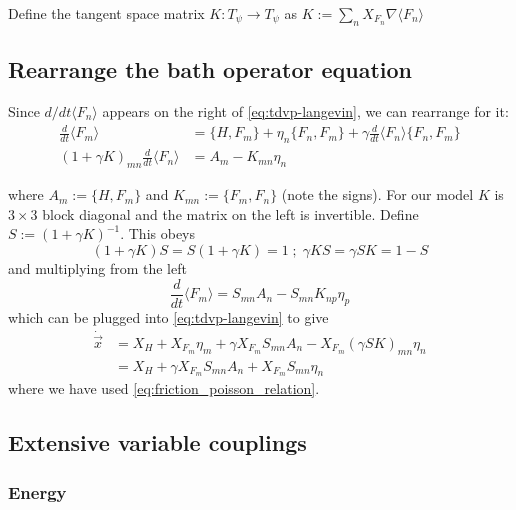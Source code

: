        Define the tangent space matrix $K: T_\psi\to T_\psi$ as $K:=\sum_n X_{F_n} \nabla\langle F_n\rangle$

    \subsection{Rearrange the bath operator equation}
        Since $d/dt\langle F_n\rangle$ appears on the right of \ref{eq:tdvp-langevin}, we can rearrange for it:
        \begin{align*}
        \frac{d}{dt}\langle F_m\rangle  &= \{H, F_m\} + \eta_n\{ F_n, F_m\}+ \gamma \frac{d}{dt}\langle F_n \rangle \{F_n, F_m\}\\
        (1+ \gamma K)_{mn} \frac{d}{dt}\langle F_n\rangle &= A_m - K_{mn}\eta_n    
        \end{align*}
        
        where $A_m:=\{H, F_m\}$ and $K_{mn}:=\{F_m,F_n\} $ (note the signs). For our model $K$ is $3\times 3$ block diagonal and the matrix on the left is invertible. Define $S:=(1+\gamma K)^{-1}$. This obeys  
        \begin{equation}\label{eq:friction_poisson_relation}
            (1+\gamma K)S = S(1+\gamma K) = 1 \; ;\; \gamma K S = \gamma SK = 1 - S
        \end{equation}
        and multiplying from the left
        \begin{equation}\label{eq:bath_time_dep}
            \frac{d}{dt}\langle F_m\rangle  = S_{mn} A_n - S_{mn}K_{np} \eta_p
        \end{equation}
        which can be plugged into \ref{eq:tdvp-langevin} to give
        \begin{align}
            \dot{\vec x} &= X_H + X_{F_m}\eta _m + \gamma X_{F_m}S_{mn}A_n - X_{F_m}(\gamma SK)_{mn}\eta_n \nonumber \\
            &= X_H +\gamma X_{F_m}S_{mn}A_n + X_{F_m}S_{mn}\eta_n \label{eq:tdvpl-rearr}
        \end{align}
        where we have used \ref{eq:friction_poisson_relation}. 
        
        
        
    \subsection{Extensive variable couplings}
    \subsubsection{Energy}

